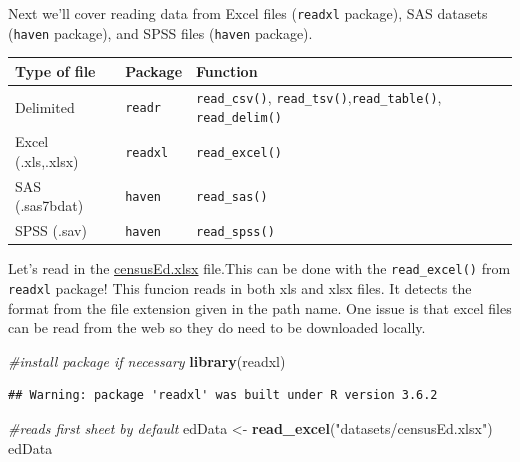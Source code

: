 \documentclass[
]{book}
\newenvironment{Shaded}{\begin{snugshade}}{\end{snugshade}}
\newcommand{\CommentTok}[1]{\textcolor[rgb]{0.56,0.35,0.01}{\textit{#1}}}
\newcommand{\KeywordTok}[1]{\textcolor[rgb]{0.13,0.29,0.53}{\textbf{#1}}}
\newcommand{\NormalTok}[1]{#1}
\newcommand{\StringTok}[1]{\textcolor[rgb]{0.31,0.60,0.02}{#1}}
\theoremstyle{definition}
\theoremstyle{definition}
\theoremstyle{definition}
\theoremstyle{remark}
\begin{document}
Next we'll cover reading data from Excel files (\texttt{readxl} package), SAS datasets (\texttt{haven} package), and SPSS files (\texttt{haven} package).

\begin{longtable}[]{@{}lll@{}}
\toprule
Type of file & Package & Function\tabularnewline
\midrule
\endhead
Delimited & \texttt{readr} & \texttt{read\_csv()}, \texttt{read\_tsv()},\texttt{read\_table()}, \texttt{read\_delim()}\tabularnewline
Excel (.xls,.xlsx) & \texttt{readxl} & \texttt{read\_excel()}\tabularnewline
SAS (.sas7bdat) & \texttt{haven} & \texttt{read\_sas()}\tabularnewline
SPSS (.sav) & \texttt{haven} & \texttt{read\_spss()}\tabularnewline
\bottomrule
\end{longtable}

Let's read in the \href{https://www4.stat.ncsu.edu/~online/datasets/censusEd.xlsx}{censusEd.xlsx} file.This can be done with the \texttt{read\_excel()} from \texttt{readxl} package! This funcion reads in both xls and xlsx files. It detects the format from the file extension given in the path name. One issue is that excel files can be read from the web so they do need to be downloaded locally.

\begin{Shaded}
\begin{Highlighting}[]
\CommentTok{#install package if necessary}
\KeywordTok{library}\NormalTok{(readxl)}
\end{Highlighting}
\end{Shaded}

\begin{verbatim}
## Warning: package 'readxl' was built under R version 3.6.2
\end{verbatim}

\begin{Shaded}
\begin{Highlighting}[]
\CommentTok{#reads first sheet by default}
\NormalTok{edData <-}\StringTok{ }\KeywordTok{read_excel}\NormalTok{(}\StringTok{"datasets/censusEd.xlsx"}\NormalTok{)}
\NormalTok{edData}
\end{Highlighting}
\end{Shaded}
\end{document}
